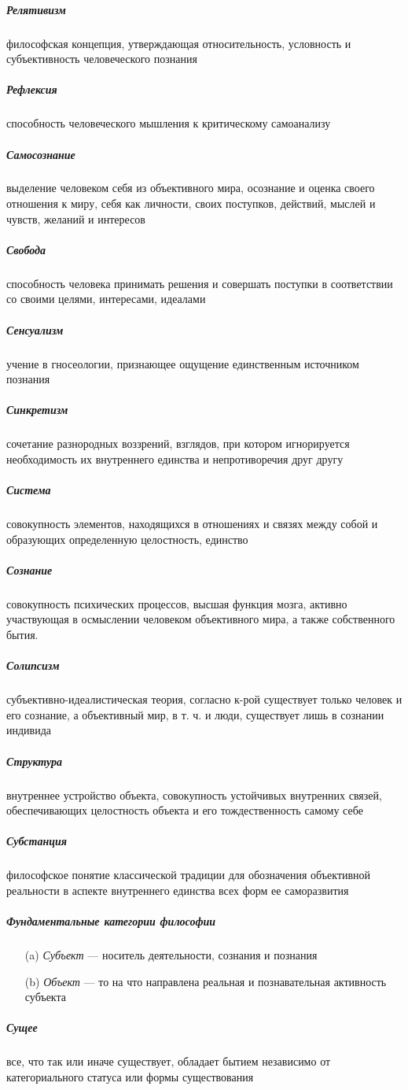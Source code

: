 \documentclass[a4paper, 12pt]{article}
\theoremstyle{plain} %
\theoremstyle{definition} %
\theoremstyle{remark} %
\begin{document}
\subparagraph{Релятивизм}
	философская концепция, утверждающая относительность, условность и субъективность человеческого познания

\subparagraph{Рефлексия}
	 способность человеческого мышления к критическому самоанализу

\subparagraph{Самосознание}
	выделение человеком себя из объективного мира, осознание и оценка своего отношения к миру, себя как личности, своих поступков, действий, мыслей и чувств, желаний и интересов

\subparagraph{Свобода}
	 способность человека принимать решения и совершать поступки в соответствии со своими целями, интересами, идеалами

\subparagraph{Сенсуализм}
	 учение в гносеологии, признающее ощущение единственным источником познания

\subparagraph{Синкретизм}
	сочетание разнородных воззрений, взглядов, при котором игнорируется необходимость их внутреннего единства и непротиворечия друг другу

\subparagraph{Система}
	совокупность элементов, находящихся в отношениях и связях между собой и образующих определенную целостность, единство

\subparagraph{Сознание}
	совокупность психических процессов, высшая функция мозга, активно участвующая в осмыслении человеком объективного мира, а также собственного бытия.

\subparagraph{Солипсизм}
	субъективно-идеалистическая теория, согласно к-рой существует только человек и его сознание, а объективный мир, в т. ч. и люди, существует лишь в сознании индивида

\subparagraph{Структура}
	внутреннее устройство объекта, совокупность устойчивых внутренних связей, обеспечивающих целостность объекта и его тождественность самому себе

\subparagraph{Субстанция}
	философское понятие классической традиции для обозначения объективной реальности в аспекте внутреннего единства всех форм ее саморазвития

\subparagraph{Фундаментальные категории философии}
\begin{itemize}
	\item[(a)] \emph{Субъект} --- носитель деятельности, сознания и познания
	\item[(b)] \emph{Объект} --- то на что направлена реальная и познавательная активность субъекта
\end{itemize}

\subparagraph{Сущее}
	все, что так или иначе существует, обладает бытием независимо от категориального статуса или формы существования
\end{document}
